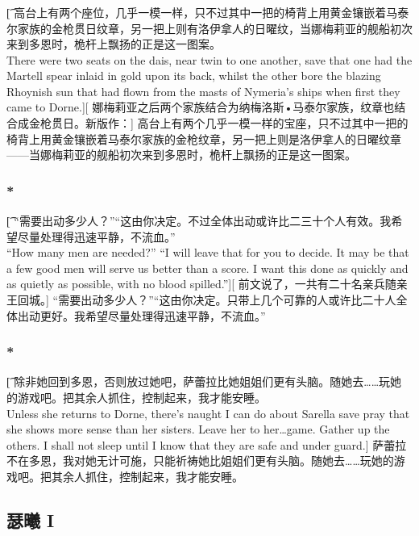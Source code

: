 \documentclass[12pt,a4paper]{article}
\begin{document}
\subsubsection{}\t[
	高台上有两个座位，几乎一模一样，只不过其中一把的椅背上用黄金镶嵌着马泰尔家族的金枪贯日纹章，另一把上则有洛伊拿人的日曜纹，当娜梅莉亚的舰船初次来到多恩时，桅杆上飘扬的正是这一图案。\\
	There were two seats on the dais, near twin to one another, save that one had the Martell spear inlaid in gold upon its back, whilst the other bore the blazing Rhoynish sun that had flown from the masts of Nymeria's ships when first they came to Dorne.][
	娜梅莉亚之后两个家族结合为纳梅洛斯•马泰尔家族，纹章也结合成金枪贯日。新版作：]
	高台上有两个几乎一模一样的宝座，只不过其中一把的椅背上用黄金镶嵌着马泰尔家族的金枪纹章，另一把上则是洛伊拿人的日曜纹章——当娜梅莉亚的舰船初次来到多恩时，桅杆上飘扬的正是这一图案。
	
\subsubsection{\color{red}*}\t[
	“需要出动多少人？”“这由你决定。不过全体出动或许比二三十个人有效。我希望尽量处理得迅速平静，不流血。”\\
	“How many men are needed?” “I will leave that for you to decide. It may be that a few good men will serve us better than a score. I want this done as quickly and as quietly as possible, with no blood spilled.”][
	前文说了，一共有二十名亲兵随亲王回城。]
	“需要出动多少人？”“这由你决定。只带上几个可靠的人或许比二十人全体出动更好。我希望尽量处理得迅速平静，不流血。”

\subsubsection{\color{red}*}\t[
	除非她回到多恩，否则放过她吧，萨蕾拉比她姐姐们更有头脑。随她去……玩她的游戏吧。把其余人抓住，控制起来，我才能安睡。\\
	Unless she returns to Dorne, there's naught I can do about Sarella save pray that she shows more sense than her sisters. Leave her to her\ldots game. Gather up the others. I shall not sleep until I know that they are safe and under guard.]
	萨蕾拉不在多恩，我对她无计可施，只能祈祷她比姐姐们更有头脑。随她去……玩她的游戏吧。把其余人抓住，控制起来，我才能安睡。
	
\subsection{瑟曦 I}
\end{document}
